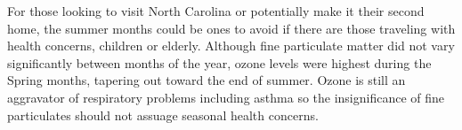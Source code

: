 \documentclass[
  12pt,
]{article}
\begin{document}
For those looking to visit North Carolina or potentially make it their
second home, the summer months could be ones to avoid if there are those
traveling with health concerns, children or elderly. Although fine
particulate matter did not vary significantly between months of the
year, ozone levels were highest during the Spring months, tapering out
toward the end of summer. Ozone is still an aggravator of respiratory
problems including asthma so the insignificance of fine particulates
should not assuage seasonal health concerns.
\end{document}
